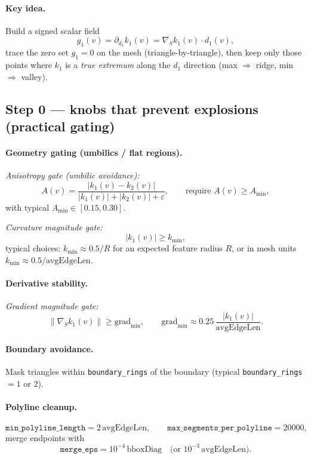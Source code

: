 \documentclass[12pt,a4paper]{article}
\theoremstyle{plain}
\theoremstyle{definition}      %
\begin{document}
	\paragraph{Key idea.}
	Build a signed scalar field
	\[
	g_1(v)=\partial_{d_1}k_1(v)=\nabla_S k_1(v)\cdot d_1(v),
	\]
	trace the zero set $g_1=0$ on the mesh (triangle-by-triangle), then keep only those points where
	$k_1$ is a \emph{true extremum} along the $d_1$ direction (max $\Rightarrow$ ridge, min $\Rightarrow$ valley).
	
	
	\subsection*{Step 0 — knobs that prevent explosions (practical gating)}
	
	\paragraph{Geometry gating (umbilics / flat regions).}
	
	\emph{Anisotropy gate (umbilic avoidance):}
	\[
	A(v)=\frac{|k_1(v)-k_2(v)|}{|k_1(v)|+|k_2(v)|+\varepsilon},
	\qquad\text{require } A(v)\ge A_{\min},
	\]
	with typical $A_{\min}\in[0.15,0.30]$.
	
	\emph{Curvature magnitude gate:}
	\[
	|k_1(v)|\ge k_{\min},
	\]
	typical choices: $k_{\min}\approx 0.5/R$ for an expected feature radius $R$, or in mesh units
	$k_{\min}\approx 0.5/\mathrm{avgEdgeLen}$.
	
	\paragraph{Derivative stability.}
	
	\emph{Gradient magnitude gate:}
	\[
	\|\nabla_S k_1(v)\|\ge \mathrm{grad}_{\min},
	\qquad
	\mathrm{grad}_{\min}\approx 0.25\,\frac{|k_1(v)|}{\mathrm{avgEdgeLen}}.
	\]
	
	\paragraph{Boundary avoidance.}
	Mask triangles within \texttt{boundary\_rings} of the boundary (typical \texttt{boundary\_rings} $=1$ or $2$).
	
	\paragraph{Polyline cleanup.}
	\[
	\texttt{min\_polyline\_length}=2\,\mathrm{avgEdgeLen},\qquad
	\texttt{max\_segments\_per\_polyline}=20000,
	\]
	merge endpoints with
	\[
	\texttt{merge\_eps}=10^{-4}\,\mathrm{bboxDiag}
	\quad\text{(or }10^{-3}\,\mathrm{avgEdgeLen}\text{)}.
	\]
	
\end{document}
